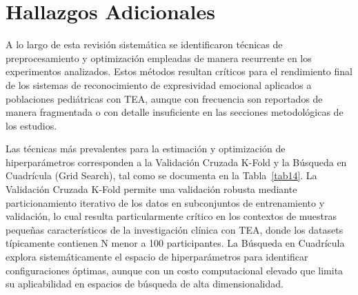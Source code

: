 \documentclass[ASNA,twocolumn]{USG}
\begin{document}
	\section{Hallazgos Adicionales}\label{sec5}
	
	A lo largo de esta revisión sistemática se identificaron técnicas de
	preprocesamiento y optimización empleadas de manera recurrente en los experimentos
	analizados. Estos métodos resultan críticos para el rendimiento final de los
	sistemas de reconocimiento de expresividad emocional aplicados a poblaciones
	pediátricas con TEA, aunque con frecuencia son reportados de manera fragmentada o
	con detalle insuficiente en las secciones metodológicas de los estudios.
	
	Las técnicas más prevalentes para la estimación y optimización de hiperparámetros
	corresponden a la Validación Cruzada K-Fold y la Búsqueda en Cuadrícula (Grid
	Search), tal como se documenta en la Tabla~\ref{tab14}. La Validación Cruzada
	K-Fold permite una validación robusta mediante particionamiento iterativo de los
	datos en subconjuntos de entrenamiento y validación, lo cual resulta
	particularmente crítico en los contextos de muestras pequeñas característicos de
	la investigación clínica con TEA, donde los datasets típicamente contienen N menor
	a 100 participantes. La Búsqueda en Cuadrícula explora sistemáticamente el espacio
	de hiperparámetros para identificar configuraciones óptimas, aunque con un costo
	computacional elevado que limita su aplicabilidad en espacios de búsqueda de alta
	dimensionalidad.
	
\end{document}
